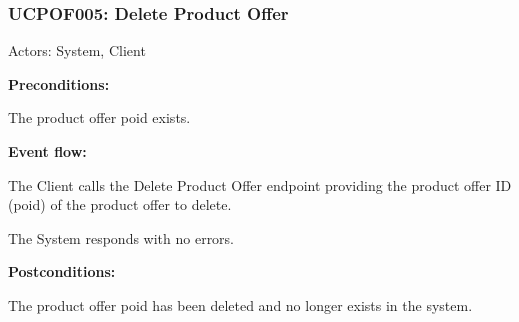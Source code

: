 \begin{ucbox}{\subsubsection{UCPOF005: Delete Product Offer}}
\label{UCPOF005}

Actors: System, Client

\textbf{Preconditions:}

\ucitem The product offer poid exists.

\textbf{Event flow:}

\ucitem The Client calls the Delete Product Offer endpoint providing the product offer ID (poid) of the product offer to delete.

\ucitem The System responds with no errors.

\textbf{Postconditions:}

\ucitem The product offer poid has been deleted and no longer exists in the system.

\end{ucbox}
\newpage